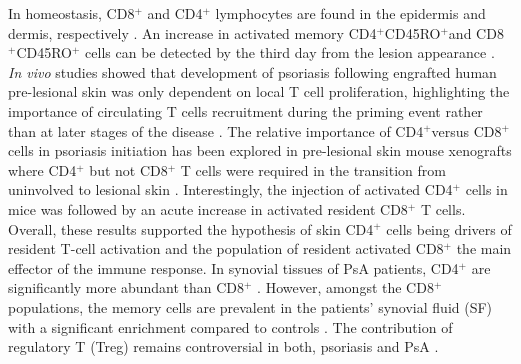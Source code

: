 In homeostasis, CD8$^+$ and CD4$^+$ lymphocytes are found in the epidermis and dermis, respectively \parencite{Clark2006}. An increase in activated memory CD4$^{+}$CD45RO$^{+}$and CD8$^{+}$CD45RO$^{+}$ cells can be detected by the third day from the lesion appearance \parencite{Clark2006,Perera2012 }. \textit{In vivo} studies showed that development of psoriasis following engrafted human pre-lesional skin was only dependent on local T cell proliferation, highlighting the importance of circulating T cells recruitment during the priming event rather than at later stages of the disease \parencite{ Boyle2013,Perera2012}. The relative importance of CD4$^+$versus CD8$^+$ cells in psoriasis initiation has been explored in pre-lesional skin mouse xenografts where CD4$^+$ but not CD8$^+$ T cells were required in the transition from uninvolved to lesional skin \parencite{Nickoloff1999}. Interestingly, the injection of activated CD4$^+$ cells in mice was followed by an acute increase in activated resident CD8$^+$ T cells. Overall, these results supported the hypothesis of skin CD4$^+$ cells being drivers of resident T-cell activation and the population of resident activated CD8$^+$ the main effector of the immune response. In synovial tissues of PsA patients, CD4$^+$ are significantly more abundant than CD8$^+$ \parencite{Diani2015}. However, amongst the CD8$^+$ populations, the memory cells are prevalent in the patients’ synovial fluid (SF) with a significant enrichment compared to controls \parencite{Costello1999}. The contribution of regulatory T (Treg) remains controversial in both, psoriasis and PsA \parencite{Perera2012}. 

